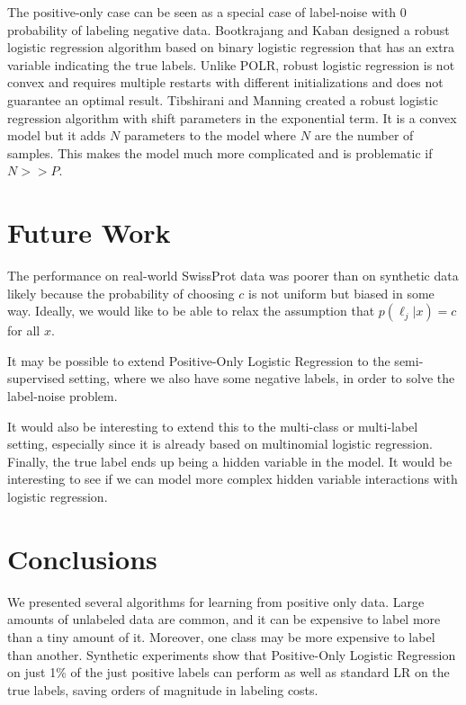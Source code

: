 \documentclass{article}
\begin{document}
The positive-only case can be seen as a special case of label-noise with 0 probability of labeling negative data. Bootkrajang and Kaban  designed a robust logistic regression algorithm based on binary logistic regression that has an extra variable indicating the true labels.  Unlike POLR, robust logistic regression is not convex and requires multiple restarts with different initializations and does not guarantee an optimal result. Tibshirani and Manning  created a robust logistic regression algorithm with  shift parameters in the exponential term.  It is a convex model but it adds $N$ parameters to the model where $N$ are the number of samples.  This makes the model much more complicated and is problematic if $N >> P$.

\section{Future Work}

The performance on real-world SwissProt data was poorer than on synthetic data likely because the probability of choosing $c$ is not uniform but biased in some way. Ideally, we would like to be able to relax the assumption that $p(\ell_j|x)=c$ for all $x$.  

It may be possible to extend Positive-Only Logistic Regression to the semi-supervised setting, where we also have some negative labels, in order to solve the label-noise problem.

It would also be interesting to extend this to the multi-class or multi-label setting, especially since it is already based on multinomial logistic regression. Finally, the true label ends up being a hidden variable in the model. It would be interesting to see if we can model more complex hidden variable interactions with logistic regression.

\section{Conclusions}

We presented several algorithms for learning from positive only data. Large amounts of unlabeled data are common, and it can be expensive to label more than a tiny amount of it.  Moreover, one class may be more expensive to label than another. Synthetic experiments show that Positive-Only Logistic Regression on just 1\% of the just positive labels can perform as well as standard LR on the true labels, saving orders of magnitude in labeling costs.
\end{document}
